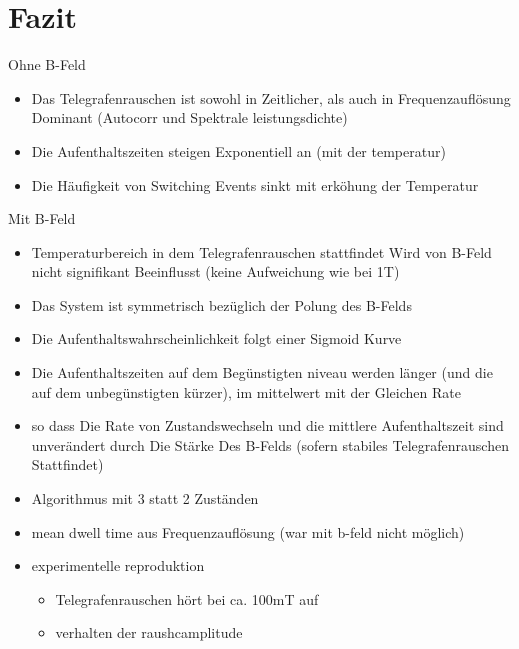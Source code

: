 \documentclass[main.tex]{subfiles}
\begin{document}
\newpage
\section{Fazit}

Ohne B-Feld
\begin{itemize}
    \item Das Telegrafenrauschen ist sowohl in Zeitlicher, als auch in Frequenzauflösung Dominant (Autocorr und Spektrale leistungsdichte)
    \item Die Aufenthaltszeiten steigen Exponentiell an (mit der temperatur)
    \item Die Häufigkeit von Switching Events sinkt mit erköhung der Temperatur
\end{itemize}

Mit B-Feld
\begin{itemize}
    \item Temperaturbereich in dem Telegrafenrauschen stattfindet Wird von B-Feld nicht signifikant Beeinflusst (keine Aufweichung wie bei 1T)
    \item Das System ist symmetrisch bezüglich der Polung des B-Felds 
    \item Die Aufenthaltswahrscheinlichkeit folgt einer Sigmoid Kurve
    \item Die Aufenthaltszeiten auf dem Begünstigten niveau werden länger (und die auf dem unbegünstigten kürzer), im mittelwert mit der Gleichen Rate
    \item so dass Die Rate von Zustandswechseln und die mittlere Aufenthaltszeit sind unverändert durch Die Stärke Des B-Felds (sofern stabiles Telegrafenrauschen Stattfindet)
\end{itemize}

\begin{itemize}
    \item Algorithmus mit 3 statt 2 Zuständen
    \item mean dwell time aus Frequenzauflösung (war mit b-feld nicht möglich)
    \item experimentelle reproduktion 
    \begin{itemize}
        \item Telegrafenrauschen hört bei ca. 100mT auf
        \item verhalten der raushcamplitude
    \end{itemize}
\end{itemize}
\end{document}
